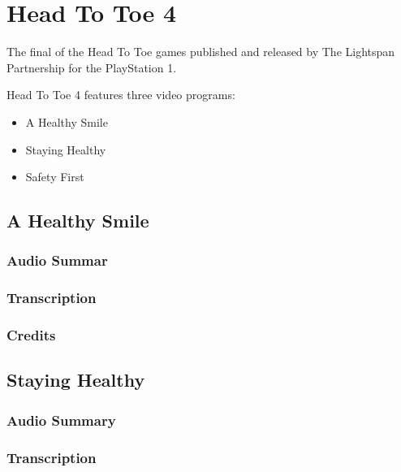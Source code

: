 \chapter{Head To Toe 4}


The final of the Head To Toe games published and released by The Lightspan Partnership for the PlayStation 1.

Head To Toe 4 features three video programs:

\begin{itemize}
    \item A Healthy Smile
    \item Staying Healthy
    \item Safety First
\end{itemize}

\clearpage
\newpage

\section{A Healthy Smile}

\subsection{Audio Summar}

\subsection{Transcription}

\subsection{Credits}

\section{Staying Healthy}

\subsection{Audio Summary}

\subsection{Transcription}

